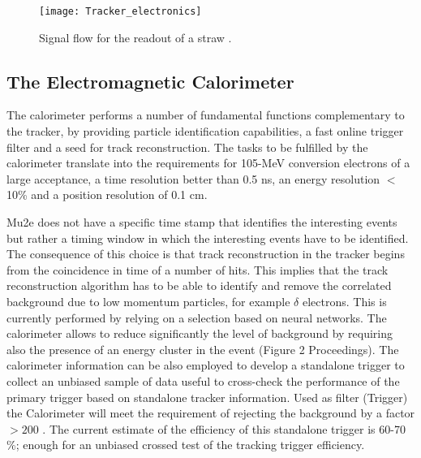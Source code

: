 \documentclass[12pt,a4paper,openright, oneside, titlepage]{book} %
\begin{document}
\begin{figure}[h!]
\centering
\texttt{[image: Tracker\_electronics]}
\caption{Signal flow for the readout of a straw \cite{MTDR}.}
\label{_tracker_electronics}
\end{figure}


\subsection{The Electromagnetic Calorimeter}
The calorimeter performs a number of fundamental functions complementary to the tracker, by providing 
particle identification capabilities, a fast online trigger filter and a seed for track reconstruction.
The tasks to be fulfilled by the calorimeter translate into the requirements for 105-MeV
conversion electrons of a large acceptance, a time resolution better than 0.5 ns, 
an energy resolution $<$10\% and a position resolution of 0.1 cm.

\noindent
Mu2e does not have a specific time stamp that identifies the interesting events 
but rather a timing window in which the interesting events have to be identified. 
The consequence of this choice is that track reconstruction
in the tracker begins from the coincidence in time of a number of hits. This implies that
the track reconstruction algorithm has to be able to identify and remove the correlated
background due to low momentum particles, for example $\delta$ electrons. 
This is currently performed by relying on a selection based on neural networks.
The calorimeter allows to reduce significantly the level of background by requiring
also the presence of an energy cluster in the event (Figure 2 Proceedings).
The calorimeter information can be also employed to develop a standalone trigger
to collect an unbiased sample of data useful to cross-check the performance of the
primary trigger based on standalone tracker information.
Used as filter (Trigger) the Calorimeter will meet the requirement of rejecting the background by a factor $>200$ \cite{Calorimeter:2018}\cite{Donghia:2019}. The current estimate of the efficiency of this standalone trigger is 60-70 \%; enough for an unbiased crossed test of the tracking trigger efficiency.\\ 
\end{document}
